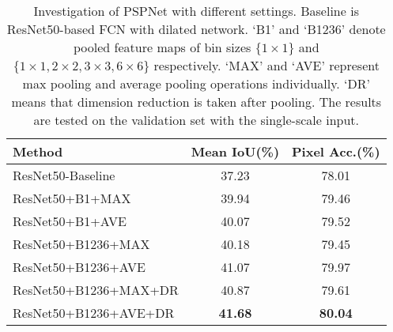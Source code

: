 \documentclass[10pt,twocolumn,letterpaper]{article}
\begin{document}
\begin{table}
\footnotesize
\begin{center}
\begin{tabular}{ l c c}
\hline
Method & Mean IoU(\%) & Pixel Acc.(\%) \\
\hline\hline
ResNet50-Baseline & 37.23 & 78.01 \\
ResNet50+B1+MAX & 39.94 & 79.46 \\
ResNet50+B1+AVE & 40.07 & 79.52 \\
ResNet50+B1236+MAX & 40.18 & 79.45 \\
ResNet50+B1236+AVE & 41.07 & 79.97 \\
ResNet50+B1236+MAX+DR & 40.87 & 79.61 \\
ResNet50+B1236+AVE+DR & \textbf{41.68} & \textbf{80.04} \\
\hline
\end{tabular}
\end{center}
\caption{Investigation of PSPNet with different settings. Baseline is ResNet50-based FCN
with dilated network. `B1' and `B1236' denote pooled feature maps of bin sizes $\{1\times
1\}$ and $\{1\times1, 2\times2, 3\times3, 6\times6\}$ respectively. `MAX' and `AVE'
represent max pooling and average pooling operations individually. `DR' means that
dimension reduction is taken after pooling. The results are tested on the validation set
with the single-scale input.} \label{tab:pspnet}
\end{table}

\vspace{-0.1in}
\end{document}
